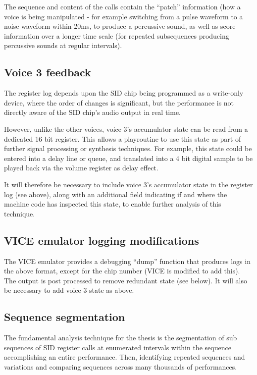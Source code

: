 \documentclass[10pt]{article}
\begin{document}
\begin{multicols*}{2}
The sequence and content of the calls contain the “patch” information (how a voice is being manipulated - for example switching from a pulse waveform to a noise waveform within 20ms, to produce a percussive sound, as well as score information over a longer time scale (for repeated subsequences producing percussive sounds at regular intervals).
    
\subsection{Voice 3 feedback}

The register log depends upon the SID chip being programmed as a write-only device, where the order of changes is significant, but the performance is not directly aware of the SID chip’s audio output in real time.

However, unlike the other voices, voice 3’s accumulator state can be read from a dedicated 16 bit register. This allows a playroutine to use this state as part of further signal processing or synthesis techniques. For example, this state could be entered into a delay line or queue, and translated into a 4 bit digital sample to be played back via the volume register as delay effect.

It will therefore be necessary to include voice 3’s accumulator state in the register log (see above), along with an additional field indicating if and where the machine code has inspected this state, to enable further analysis of this technique.

\subsection{VICE emulator logging modifications}

The VICE emulator provides a debugging “dump” function that produces logs in the above format, except for the chip number (VICE is modified to add this). The output is post processed to remove redundant state (see below). It will also be necessary to add voice 3 state as above.

\subsection{Sequence segmentation}

The fundamental analysis technique for the thesis is the segmentation of sub sequences of SID register calls at enumerated intervals within the sequence accomplishing an entire performance. Then, identifying repeated sequences and variations and comparing sequences across many thousands of performances.


\end{multicols*}
\end{document}
